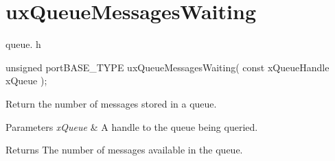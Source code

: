 \hypertarget{group__ux_queue_messages_waiting}{\section{ux\-Queue\-Messages\-Waiting}
\label{group__ux_queue_messages_waiting}
}
queue. h 
\begin{DoxyPre}unsigned portBASE\_TYPE uxQueueMessagesWaiting( const xQueueHandle xQueue );\end{DoxyPre}


Return the number of messages stored in a queue.


\begin{DoxyParams}{Parameters}
{\em x\-Queue} & A handle to the queue being queried.\\
\hline
\end{DoxyParams}
\begin{DoxyReturn}{Returns}
The number of messages available in the queue. 
\end{DoxyReturn}
